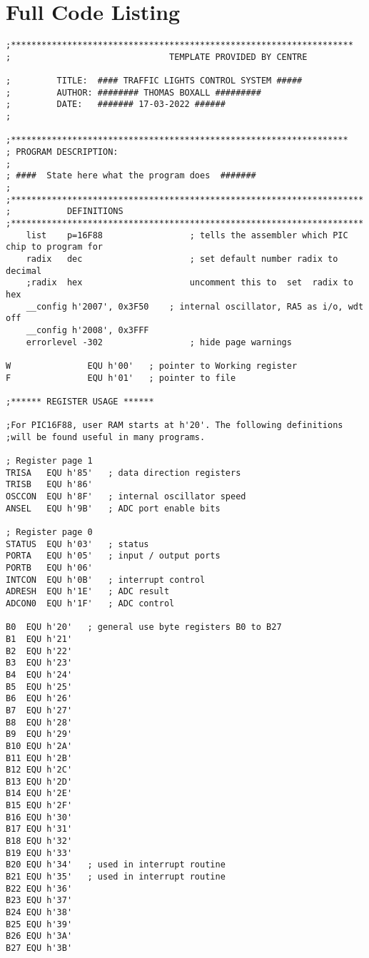 \chapter{Full Code Listing}
\label{app:full-code}

\begin{lstlisting}[language={[x86masm]Assembler}, style=assembly, caption=Full code listing]
;*******************************************************************
;                               TEMPLATE PROVIDED BY CENTRE

;         TITLE:  #### TRAFFIC LIGHTS CONTROL SYSTEM #####
;         AUTHOR: ######## THOMAS BOXALL #########
;         DATE:   ####### 17-03-2022 ######
;

;******************************************************************
; PROGRAM DESCRIPTION:
;
; ####  State here what the program does  #######
;
;*********************************************************************
;			DEFINITIONS
;*********************************************************************
    list    p=16F88             	; tells the assembler which PIC chip to program for
    radix	dec                 	; set default number radix to decimal
    ;radix	hex                 	uncomment this to  set  radix to hex
    __config h'2007', 0x3F50	; internal oscillator, RA5 as i/o, wdt off
    __config h'2008', 0x3FFF	
    errorlevel -302             	; hide page warnings

W           	EQU h'00'	; pointer to Working register
F            	EQU h'01'	; pointer to file

;****** REGISTER USAGE ******

;For PIC16F88, user RAM starts at h'20'. The following definitions
;will be found useful in many programs.

; Register page 1
TRISA	EQU h'85'	; data direction registers
TRISB	EQU h'86'
OSCCON	EQU h'8F'	; internal oscillator speed
ANSEL	EQU h'9B'	; ADC port enable bits

; Register page 0        
STATUS	EQU h'03' 	; status
PORTA	EQU h'05'	; input / output ports
PORTB	EQU h'06'
INTCON	EQU h'0B'	; interrupt control
ADRESH	EQU h'1E'	; ADC result
ADCON0	EQU h'1F'	; ADC control

B0	EQU h'20'	; general use byte registers B0 to B27
B1	EQU h'21'
B2	EQU h'22'
B3	EQU h'23'
B4	EQU h'24'
B5	EQU h'25'
B6	EQU h'26'
B7	EQU h'27'
B8	EQU h'28'
B9	EQU h'29'
B10	EQU h'2A'
B11	EQU h'2B'
B12	EQU h'2C'
B13	EQU h'2D'
B14	EQU h'2E'
B15	EQU h'2F'
B16	EQU h'30'
B17	EQU h'31'
B18	EQU h'32'
B19	EQU h'33'
B20	EQU h'34'	; used in interrupt routine
B21	EQU h'35'	; used in interrupt routine
B22	EQU h'36'
B23	EQU h'37'
B24	EQU h'38'
B25	EQU h'39'
B26	EQU h'3A'
B27	EQU h'3B'


\end{lstlisting}

